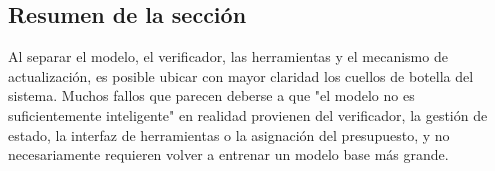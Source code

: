 \subsection{Resumen de la sección}

Al separar el modelo, el verificador, las herramientas y el mecanismo de actualización, es posible ubicar con mayor claridad los cuellos de botella del sistema. Muchos fallos que parecen deberse a que "el modelo no es suficientemente inteligente" en realidad provienen del verificador, la gestión de estado, la interfaz de herramientas o la asignación del presupuesto, y no necesariamente requieren volver a entrenar un modelo base más grande.

